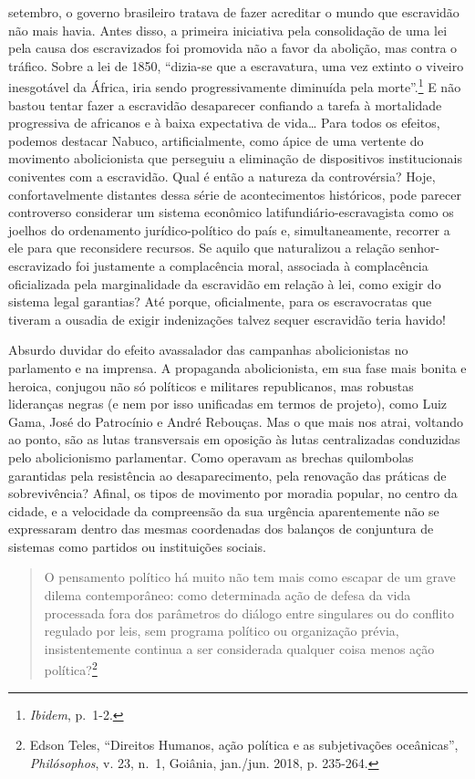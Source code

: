 setembro, o governo brasileiro tratava de fazer acreditar o mundo que
escravidão não mais havia. Antes disso, a primeira iniciativa pela
consolidação de uma lei pela causa dos escravizados foi promovida não a
favor da abolição, mas contra o tráfico. Sobre a lei de 1850, ``dizia-se
que a escravatura, uma vez extinto o viveiro inesgotável da África, iria
sendo progressivamente diminuída pela morte''.\footnote{\textit{Ibidem},
  p.~1-2.} E não bastou tentar fazer a escravidão desaparecer confiando
a tarefa à mortalidade progressiva de africanos e à baixa expectativa de
vida\dots{} Para todos os efeitos, podemos destacar Nabuco, artificialmente,
como ápice de uma vertente do movimento abolicionista que perseguiu a
eliminação de dispositivos institucionais coniventes com a escravidão.
Qual é então a natureza da controvérsia? Hoje, confortavelmente
distantes dessa série de acontecimentos históricos, pode parecer
controverso considerar um sistema econômico latifundiário-escravagista
como os joelhos do ordenamento jurídico-político do país e,
simultaneamente, recorrer a ele para que reconsidere recursos. Se aquilo
que naturalizou a relação senhor-escravizado foi justamente a
complacência moral, associada à complacência oficializada pela
marginalidade da escravidão em relação à lei, como exigir do sistema
legal garantias? Até porque, oficialmente, para os escravocratas que
tiveram a ousadia de exigir indenizações talvez sequer escravidão teria
havido!

Absurdo duvidar do efeito avassalador das campanhas abolicionistas no
parlamento e na imprensa. A propaganda abolicionista, em sua fase mais
bonita e heroica, conjugou não só políticos e militares republicanos,
mas robustas lideranças negras (e nem por isso unificadas em termos de
projeto), como Luiz Gama, José do Patrocínio e André Rebouças. Mas o que
mais nos atrai, voltando ao ponto, são as lutas transversais em oposição
às lutas centralizadas conduzidas pelo abolicionismo parlamentar. Como
operavam as brechas quilombolas garantidas pela resistência ao
desaparecimento, pela renovação das práticas de sobrevivência? Afinal,
os tipos de movimento por moradia popular, no centro da cidade, e a
velocidade da compreensão da sua urgência aparentemente não se
expressaram dentro das mesmas coordenadas dos balanços de conjuntura de
sistemas como partidos ou instituições sociais.

\begin{quote}
O pensamento político há muito não tem mais como escapar de um grave
dilema contemporâneo: como determinada ação de defesa da vida processada
fora dos parâmetros do diálogo entre singulares ou do conflito regulado
por leis, sem programa político ou organização prévia, insistentemente
continua a ser considerada qualquer coisa menos ação política?\footnote{Edson
  Teles, ``Direitos Humanos, ação política e as subjetivações
  oceânicas'', \textit{Philósophos}, v. 23, n.~1, Goiânia, jan./jun. 2018,
  p. 235-264.}
\end{quote}


